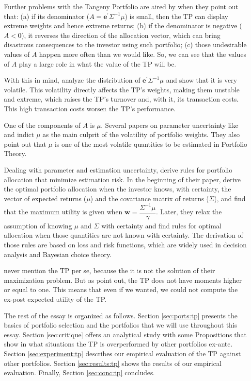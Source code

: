 \documentclass[12pt,oneside,a4paper]{memoir}
\begin{document}
Further problems with the Tangeny Portfolio are aired by  when they point out that:
(a) if its denominator ($A = \mathbf{e}^{\prime} \Sigma^{-1} \mu$) is small, then the TP can display extreme weights and hence extreme returns;
(b) if  the denominator is negative ($A<0$), it reverses the direction of the allocation vector, which can bring disastrous consequences to the investor using such portfolio;
(c) those undesirable values of $A$ happen more often than we would like. So, we can see that the values of $A$ play a large role in what the value of the TP will be.

With this in mind,  analyze the distribution of $\mathbf{e}^{\prime} \Sigma^{-1}\mu$ and show that it is very volatile. This volatility directly affects the TP's weights, making them unstable and extreme, which raises the TP's turnover and, with it, its transaction costs. This high transaction costs worsen the TP's performance.

One of the components of $A$ is $\mu$.
Several papers on parameter uncertainty like  and  indict $\mu$ as the main culprit of the volatility of portfolio weights.
They also point out that $\mu$ is one of the most volatile quantities to be estimated in Portfolio Theory.

Dealing with parameter and estimation uncertainty,  derive rules for portfolio allocation that minimize estimation risk.
In the beginning of their paper,  derive the optimal portfolio allocation when the investor knows, with certainty, the vector of expected returns ($\mu$) and the covariance matrix of returns ($\Sigma$), and find that the maximum utility is given when $\mathbf{w}=\dfrac{\Sigma^{-1}\mu}{\gamma}$. Later, they relax the assumption of knowing $\mu$ and $\Sigma$ with certainty and find rules for optimal allocation when those quantities are not known with certainty. The derivation of those rules are based on loss and risk functions, which are widely used in decision analysis and Bayesian choice theory.

 never mention the TP per se, because the it is not the solution of their maximization problem. But as  point out, the TP does not have moments higher or equal to one. This means that even if we wanted, we could not compute the ex-post expected utility of the TP.

The rest of the essay is organized as follows.
Section \ref{sec:ports:tp} presents the basics of portfolio selection and the portfolios that we will use throughout this essay.
Section \ref{sec:critique} offers an analytical study with some Propositions that show in what situations the TP is overperformed by other portfolios ex-ante.
Section \ref{sec:experiment:tp} describes our empirical evaluation of the TP against other portfolios.
Section \ref{sec:results:tp} shows the results of our empirical evaluation.
Finally, Section \ref{sec:conc:tp} concludes.
\end{document}

